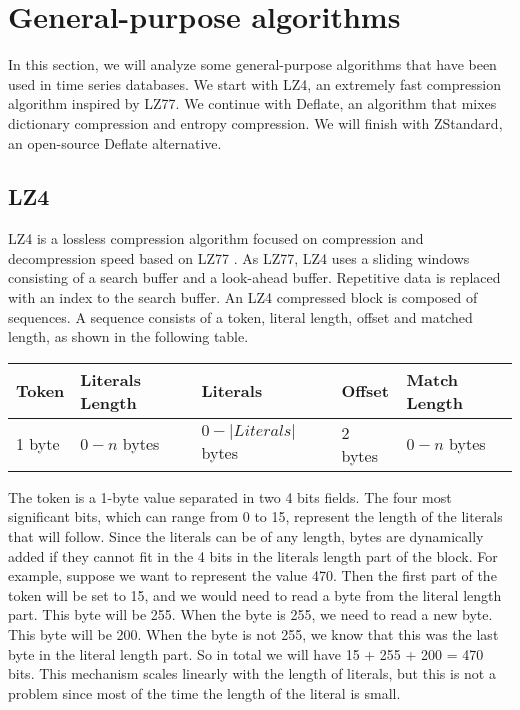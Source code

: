 \section{General-purpose algorithms}
In this section, we will analyze some general-purpose algorithms that have been used in
time series databases. We start with LZ4, an extremely fast compression algorithm inspired
by LZ77. We continue with Deflate, an algorithm that mixes dictionary compression and entropy
compression. We will finish with ZStandard, an open-source Deflate alternative.

\subsection{LZ4}
LZ4 is a lossless compression algorithm focused on compression and decompression speed
based on LZ77 \cite{Ziv1977A}\cite{lz42019lz4lz4}. As LZ77, LZ4 uses a sliding windows
consisting of a search buffer and a look-ahead buffer. Repetitive data is replaced with
an index to the search buffer. An LZ4 compressed block is composed of sequences.
A sequence consists of a token, literal length, offset and matched length, as
shown in the following table.
\begin{table}[!htbp]
\centering
\begin{tabular}{l|l|l|l|l}
\textbf{Token} & \textbf{Literals Length} & \textbf{Literals} & \textbf{Offset} & \textbf{Match Length} \\ 
\hline
1 byte & $0-n$ bytes & $0-|Literals|$ bytes & 2 bytes & $0-n$ bytes \\
\end{tabular}
\end{table}
The token is a 1-byte value separated in two 4 bits fields. The four most significant bits,
which can range from 0 to 15, represent the length of the literals that will follow. Since
the literals can be of any length, bytes are dynamically added if they cannot fit in the 4
bits in the literals length part of the block. For example, suppose we want to represent
the value 470. Then the first part of the token will be set to 15, and we would need to
read a byte from the literal length part. This byte will be 255. When the byte is 255,
we need to read a new byte. This byte will be 200. When the byte is not 255, we know that
this was the last byte in the literal length part. So in total we will have
15 + 255 + 200 = 470 bits.
This mechanism scales linearly with the length of literals, but this is not a problem
since most of the time the length of the literal is small.
